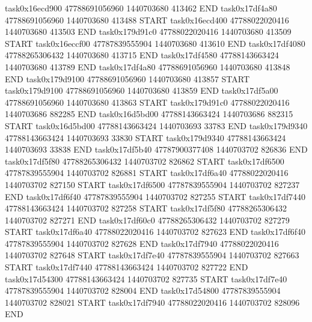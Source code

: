 task0x16ecd900 47788691056960          1440703680               413462  END
task0x17df4a80 47788691056960          1440703680               413488  START
task0x16ecd400 47788022020416          1440703680               413503  END
task0x179d91c0 47788022020416          1440703680               413509  START
task0x16eccf00 47787839555904          1440703680               413610  END
task0x17df4080 47788265306432          1440703680               413715  END
task0x17df4580 47788143663424          1440703680               413789  END
task0x17df4a80 47788691056960          1440703680               413848  END
task0x179d9100 47788691056960          1440703680               413857  START
task0x179d9100 47788691056960          1440703680               413859  END
task0x17df5a00 47788691056960          1440703680               413863  START
task0x179d91c0 47788022020416          1440703686               882285  END
task0x16d5bd00 47788143663424          1440703686               882315  START
task0x16d5bd00 47788143663424          1440703693                33783  END
task0x179d9340 47788143663424          1440703693                33830  START
task0x179d9340 47788143663424          1440703693                33838  END
task0x17df5b40 47787900377408          1440703702               826836  END
task0x17df5f80 47788265306432          1440703702               826862  START
task0x17df6500 47787839555904          1440703702               826881  START
task0x17df6a40 47788022020416          1440703702               827150  START
task0x17df6500 47787839555904          1440703702               827237  END
task0x17df6f40 47787839555904          1440703702               827255  START
task0x17df7440 47788143663424          1440703702               827258  START
task0x17df5f80 47788265306432          1440703702               827271  END
task0x17df60c0 47788265306432          1440703702               827279  START
task0x17df6a40 47788022020416          1440703702               827623  END
task0x17df6f40 47787839555904          1440703702               827628  END
task0x17df7940 47788022020416          1440703702               827648  START
task0x17df7e40 47787839555904          1440703702               827663  START
task0x17df7440 47788143663424          1440703702               827722  END
task0x17d54300 47788143663424          1440703702               827735  START
task0x17df7e40 47787839555904          1440703702               828004  END
task0x17d54800 47787839555904          1440703702               828021  START
task0x17df7940 47788022020416          1440703702               828096  END
